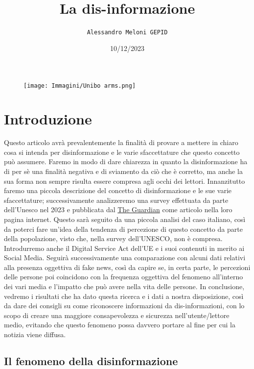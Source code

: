 \documentclass{article}
\title{\Huge\textbf{La dis-informazione}}
\author{\texttt{Alessandro Meloni GEPID}}
\date{10/12/2023}
\begin{document}
\begin{figure}
    \centering
    \texttt{[image: Immagini/Unibo arms.png]}
\end{figure}
    \maketitle
\centering\tableofcontents
\newpage \section{Introduzione}
\flushleft
\begin{justify}
    Questo articolo avrà prevalentemente la finalità di provare a mettere in chiaro cosa si intenda per disinformazione e le varie sfaccettature che questo concetto può assumere.
    Faremo in modo di dare chiarezza in quanto la disinformazione ha di per sè una finalità negativa e di sviamento da ciò che è corretto, ma anche la sua forma non sempre risulta essere compresa agli occhi dei lettori.
    Innanzitutto faremo una piccola descrizione del concetto di disinformazione e le sue varie sfaccettature; successivamente analizzeremo una survey effettuata da parte dell'Unesco nel 2023 e pubblicata dal \href{https://www.theguardian.com/technology/2023/nov/07/85-of-people-worry-about-online-disinformation-global-survey-finds}{The Guardian}\label{:articolo} come articolo nella loro pagina internet. Questo sarà seguito da una piccola analisi del caso italiano, così da poterci fare un'idea della tendenza di percezione di questo concetto da parte della popolazione, visto che, nella survey dell'UNESCO, non è compresa.
    Introdurremo anche il Digital Service Act dell'UE e i suoi contenuti in merito ai Social Media.
    Seguirà successivamente una comparazione con alcuni dati relativi alla presenza oggettiva di fake news, così da capire se, in certa parte, le percezioni delle persone poi coincidono con la frequenza oggettiva del fenomeno all'interno dei vari media e l'impatto che può avere nella vita delle persone.
    In conclusione, vedremo i risultati che ha dato questa ricerca e i dati a nostra disposizione, così da dare dei consigli su come riconoscere informazioni da dis-informazioni, con lo scopo di creare una maggiore consapevolezza e sicurezza nell'utente/lettore medio, evitando che questo fenomeno possa davvero portare al fine per cui la notizia viene diffusa.
\end{justify}

\begin{center}
\section{Il fenomeno della disinformazione}
\end{center}
\end{document}
